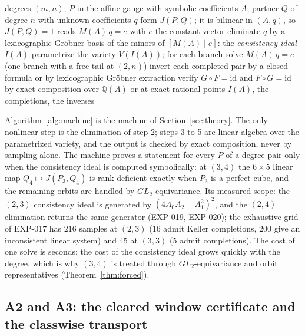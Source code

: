 \documentclass[11pt]{article}
\theoremstyle{remark}
\newcommand{\Q}{\mathbb{Q}}
\begin{document}
\begin{algorithm}[t]
\caption{A1, the planar machine for a degree pair $(m,n)$ (EXP-017 to EXP-022)}\label{alg:machine}
\begin{algorithmic}[1]
\Require degrees $(m,n)$; $P$ in the affine gauge with symbolic coefficients $A$; partner $Q$ of degree $n$ with unknown coefficients $q$
\State form $J(P,Q)$; it is bilinear in $(A,q)$, so $J(P,Q)=1$ reads $M(A)\,q=e$ with $e$ the constant vector
\State eliminate $q$ by a lexicographic Gr\"obner basis of the minors of $[M(A)\mid e]$: the \emph{consistency ideal} $I(A)$
\State parametrize the variety $V(I(A))$; for each branch solve $M(A)\,q=e$ (one branch with a free tail at $(2,n)$)
\State invert each completed pair by a closed formula or by lexicographic Gr\"obner extraction
\State verify $G\circ F=\mathrm{id}$ and $F\circ G=\mathrm{id}$ by exact composition over $\Q(A)$ or at exact rational points
\Ensure $I(A)$, the completions, the inverses
\end{algorithmic}
\end{algorithm}

Algorithm~\ref{alg:machine} is the machine of Section~\ref{sec:theory}. The only nonlinear step is the elimination of step 2;
steps 3 to 5 are linear algebra over the parametrized variety, and the output is checked by exact composition, never by
sampling alone. The machine proves a statement for every $P$ of a degree pair only when the consistency ideal is
computed symbolically: at $(3,4)$ the $6\times5$ linear map $Q_4\mapsto J(P_3,Q_4)$ is rank-deficient exactly when $P_3$ is a
perfect cube, and the remaining orbits are handled by $GL_2$-equivariance. Its measured scope: the
$(2,3)$ consistency ideal is generated by $(4A_0A_2-A_1^2)^2$, and the $(2,4)$ elimination returns
the same generator (EXP-019, EXP-020); the exhaustive grid of EXP-017 has $216$ samples at $(2,3)$ ($16$
admit Keller completions, $200$ give an inconsistent linear system) and $45$ at $(3,3)$ ($5$ admit
completions). The cost of one solve is seconds; the cost of the consistency ideal grows quickly with the
degree, which is why $(3,4)$ is treated through $GL_2$-equivariance and orbit representatives
(Theorem~\ref{thm:forced}).

\subsection{A2 and A3: the cleared window certificate and the classwise transport}
\end{document}
